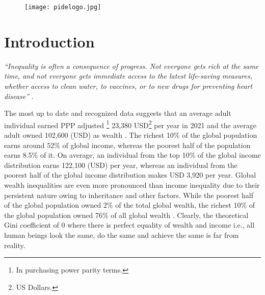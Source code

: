 \documentclass[12pt]{article}
\newcommand{\1}{\mathbbm 1}
\begin{document}
		\newpage{}
		
		\begin{figure}[H]
			\begin{center}
				\texttt{[image: pidelogo.jpg]}		
				\caption*{}
			\end{center}
		\end{figure}
		
		\vspace{-8ex}
		
		
		
		\tableofcontents
		
		\newpage{}
		
		\vspace{-8ex}
		
		\section{Introduction}
		
		
		\textit{``Inequality  is  often  a  consequence  of  progress.  Not everyone gets  rich  at  the  same  time,  and  not  everyone  gets  immediate  access  to  the  latest  life-saving  measures, whether  access  to  clean  water,  to  vaccines, or to new drugs for preventing heart disease''} \cite{deaton2013great}.
		
		The most up to date and recognized data suggests that an average adult individual earned PPP adjusted \footnote{In purchasing power parity terms.} 23,380 USD\footnote{US Dollars.} per  year  in  2021  and  the  average  adult owned 102,600 (USD) as wealth \cite{chancel2022world}. The  richest  10\% of the global population earns around 52\%  of global  income,  whereas  the  poorest  half  of  the  population  earns  8.5\%  of  it. On average, an individual from  the  top  10\%  of the global income distribution earns 122,100 (USD)  per year, whereas an individual from  the  poorest  half  of  the  global  income  distribution  makes USD 3,920  per  year. Global wealth inequalities are even  more  pronounced  than  income  inequality due to their persistent nature owing to inheritance and other factors. While the poorest half of the global population owned 2\% of the total global wealth, the richest 10\% of the global population owned 76\% of all global wealth \cite{chancel2022world}. Clearly, the theoretical Gini coefficient of 0 where there is perfect equality of wealth and income i.e., all human beings look the same, do the same and achieve the same is far from reality.
		
		
		
\end{document}
